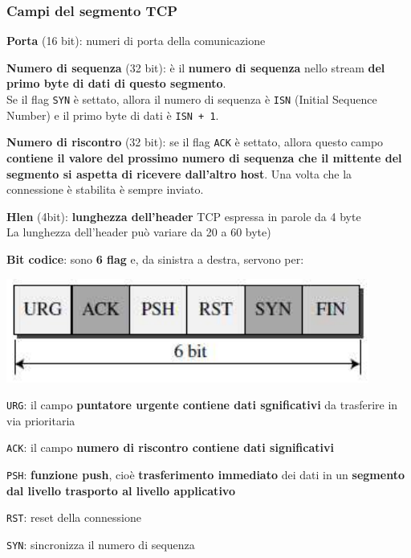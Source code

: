 \documentclass[10pt]{article}
\begin{document}
\subsubsection{Campi del segmento TCP}
\begin{list}{}{}
\item \textbf{Porta} (16 bit): numeri di porta della comunicazione
\item \textbf{Numero di sequenza} (32 bit): è il \textbf{numero di sequenza} nello stream \textbf{del primo byte di dati di questo segmento}.\\Se il flag \texttt{SYN} è settato, allora il numero di sequenza è \texttt{ISN} (Initial Sequence Number) e il primo byte di dati è \texttt{ISN + 1}.
\item \textbf{Numero di riscontro} (32 bit): se il flag \texttt{ACK} è settato, allora questo campo \textbf{contiene il valore del prossimo numero di sequenza che il mittente del segmento si aspetta di ricevere dall'altro host}. Una volta che la connessione è stabilita è sempre inviato.
\item \textbf{Hlen} (4bit): \textbf{lunghezza dell'header} TCP espressa in parole da 4 byte\\La lunghezza dell'header può variare da 20 a 60 byte)
\item \textbf{Bit codice}: sono \textbf{6 flag} e, da sinistra a destra, servono per:
	\begin{center}
	\includegraphics[scale=0.7]{flagtcp.png}
	\end{center}
	\begin{list}{}{}
	\item \texttt{URG}: il campo \textbf{puntatore urgente contiene dati sgnificativi} da trasferire in via prioritaria
	\item \texttt{ACK}: il campo \textbf{numero di riscontro contiene dati significativi}
	\item \texttt{PSH}: \textbf{funzione push}, cioè \textbf{trasferimento immediato} dei dati in un \textbf{segmento dal livello trasporto al livello applicativo}
	\item \texttt{RST}: reset della connessione
	\item \texttt{SYN}: sincronizza il numero di sequenza

\end{list}
\end{list}
\end{document}
